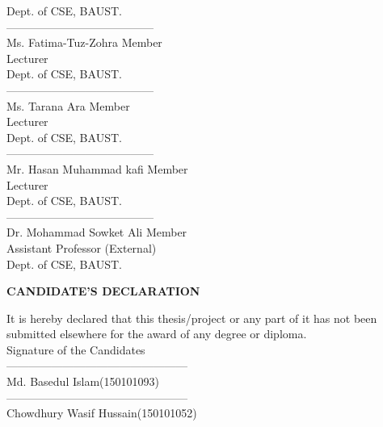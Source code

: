 \documentclass[12pt,a4paper]{report}
\begin{document}
\begin{titlepage}
	Dept. of CSE, BAUST.
	\vspace{.5in}\\\newpage
	\RaggedRight ---------------------------------------\\
	Ms. Fatima-Tuz-Zohra\hspace{20.8em} Member\\
	Lecturer\\
	Dept. of CSE, BAUST.
	\vspace{.5in}\\
	\RaggedRight ---------------------------------------\\
	Ms. Tarana Ara\hspace{23.5em} Member\\
	Lecturer\\
	Dept. of CSE, BAUST.
	\vspace{.5in}\\
	\RaggedRight ---------------------------------------\\
	Mr. Hasan Muhammad kafi\hspace{18.8em} Member\\
	Lecturer\\
	Dept. of CSE, BAUST.
	\vspace{.5in}\\
	\RaggedRight ---------------------------------------\\
	Dr. Mohammad Sowket Ali\hspace{18.5em} Member\\
	Assistant Professor\hspace{21.8em} (External)\\
	Dept. of CSE, BAUST.
	
	\newpage
	\clearpage\mbox{}\clearpage
	\begin{center}
	\MakeUppercase{\textbf{Candidate's Declaration}}
	\end{center}
	{\RaggedRight\justify It is hereby declared that this thesis/project or any part of it has not been submitted elsewhere for the award of any degree or diploma.}\\
	
	\vspace{5em}
	\hspace{20.5em}Signature of the Candidates\\
	\vspace{2em}
	\hspace{18em}------------------------------------------------\\
	\hspace{19.5em}Md. Basedul Islam(150101093)\\
	\vspace{2em}
	\hspace{18em}------------------------------------------------\\
	\hspace{18em}Chowdhury Wasif Hussain(150101052)	
	

\end{titlepage}
\end{document}
